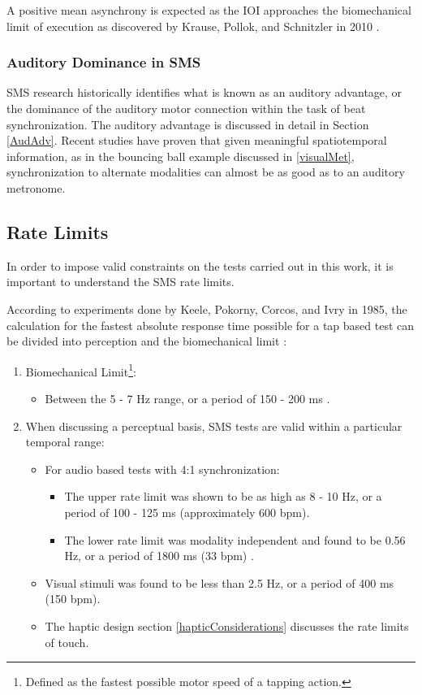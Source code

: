 A positive mean asynchrony is expected as the IOI approaches the biomechanical limit of execution as discovered by Krause, Pollok, and Schnitzler in 2010 \cite{krause2010perception}.

\subsubsection{Auditory Dominance in SMS}
SMS research historically identifies what is known as an auditory advantage, or the dominance of the auditory motor connection within the task of beat synchronization. The auditory advantage is discussed in detail in Section \ref{AudAdv}. Recent studies have proven that given meaningful spatiotemporal information, as in the bouncing ball example discussed in \ref{visualMet}, synchronization to alternate modalities can almost be as good as to an auditory metronome.

\subsection{Rate Limits} \label{rateLimits}
In order to impose valid constraints on the tests carried out in this work, it is important to understand the SMS rate limits. 

According to experiments done by Keele, Pokorny, Corcos, and Ivry in 1985, the calculation for the fastest absolute response time possible for a tap based test can be divided into perception and the biomechanical limit \cite{keele1985perception}:
\begin{enumerate}
    \item Biomechanical Limit\footnote{Defined as the fastest possible motor speed of a tapping action.}:
    \begin{itemize}
        \item Between the 5 - 7 Hz range, or a period of 150 - 200 ms \cite{repp2006rate}.
    \end{itemize}
    \item When discussing a perceptual basis, SMS tests are valid within a particular temporal range:
    \begin{itemize}
        \item For audio based tests with 4:1 synchronization:
        \begin{itemize}
            \item The upper rate limit was shown to be as high as 8 - 10 Hz, or a period of 100 - 125 ms (approximately 600 bpm). 
            \item The lower rate limit was modality independent and found to be 0.56 Hz, or a period of 1800 ms (33 bpm) \cite{repp2006rate}. 
        \end{itemize}
        \item Visual stimuli was found to be less than 2.5 Hz, or a period of 400 ms (150 bpm). 
        \item The haptic design section \ref{hapticConsiderations} discusses the rate limits of touch.
    \end{itemize}
\end{enumerate}

